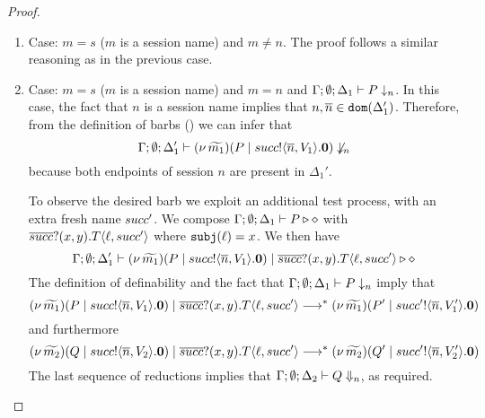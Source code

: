 \begin{proof}
\begin{enumerate}[I.]
\begin{enumerate}[1.]
				\item	Case: $m = s$ ($m$ is a session name) and $m \not= n$.
						The proof follows a similar reasoning as in the previous case.

				\item	Case: $m = s$ ($m$ is a session name) and $m = n$ and
						$\Gamma; \emptyset; \Delta_1 \vdash P \downarrow_{n}$.
						In this case, 
						the fact that $n$ is a session name
						implies that $n, \overline{n} \in \mathtt{dom}(\Delta_1')$.
						Therefore, from the definition
						of barbs () we can infer that
						\[
							\Gamma; \emptyset; \Delta_1' \vdash
							(\nu\, \widetilde{m_1})(P \;|\; succ ! \langle \overline{n}, V_1 \rangle . \mathbf{0})
							\not\downarrow_{n}
						\]
						because both endpoints of session $n$ are present in $\Delta_1'$.
						
						To observe the desired barb we exploit an additional test process, with an extra fresh name $succ'$.
						We compose $\Gamma; \emptyset; \Delta_1 \vdash P \triangleright \diamond$ with
						$\overline{succ} ? (x, y) . T\langle \ell, succ' \rangle$
						where $\mathtt{subj}(\ell) = x$. We then have 
						\[
							\Gamma; \emptyset; \Delta_1' \vdash
							(\nu\, \widetilde{m_1})(P \;|\; succ ! \langle \overline{n}, V_1 \rangle . \mathbf{0}) \;|\;
							\overline{succ} ? (x, y) . T\langle \ell, succ' \rangle \triangleright \diamond
						\]
						The definition of definability and the fact that $\Gamma; \emptyset; \Delta_1 \vdash P \downarrow_{n}$
						imply that
						\[
							(\nu\, \widetilde{m_1})(P \;|\; succ ! \langle \overline{n}, V_1 \rangle . \mathbf{0}) \;|\;
							\overline{succ} ? (x,  {y}) . T\langle \ell, succ' \rangle
							\longrightarrow^{*} 
							(\nu\, \widetilde{m_1})(P' \;|\; succ' ! \langle \overline{n}, V_1' \rangle . \mathbf{0})
						\]
						\noi and furthermore
						\[
							(\nu\, \widetilde{m_2})(Q \;|\; succ ! \langle \overline{n}, V_2 \rangle . \mathbf{0}) \;|\;
							\overline{succ} ? (x,  {y}) . T\langle \ell, succ' \rangle
							\longrightarrow^{*} 
							(\nu\, \widetilde{m_2})(Q' \;|\; succ' ! \langle \overline{n}, V_2' \rangle . \mathbf{0})
						\]
						\noi The last sequence of reductions implies that
						$\Gamma; \emptyset; \Delta_2 \vdash Q \Downarrow_{n}$, as required.
				\end{enumerate}
    

\end{enumerate}
\end{proof}
